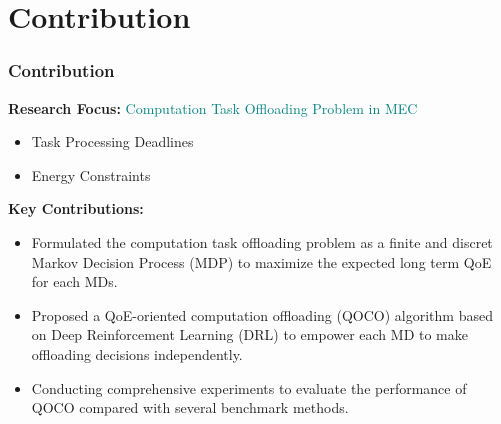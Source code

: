 \section{Contribution}


\begin{frame}
	\frametitle{Contribution}
	
	\textbf{Research Focus:} 
	\textcolor{teal}{Computation Task Offloading Problem in MEC}
	\begin{itemize}
		
		\item Task Processing Deadlines
		
		\item Energy Constraints
		
		
	\end{itemize}
	

	
	\vspace{2mm}
	
	\textbf{Key Contributions:}
	
	\begin{itemize}
		
		\item Formulated the computation task offloading problem as a finite and discret Markov Decision Process (MDP) to maximize the expected long term QoE for each MDs.
		
		\item Proposed a QoE-oriented computation offloading (QOCO) algorithm based on Deep Reinforcement Learning (DRL) to empower each MD to make offloading decisions independently.
		
		\item Conducting comprehensive experiments to evaluate the performance of QOCO compared with several benchmark methods.
		
	\end{itemize}
	
\end{frame}
